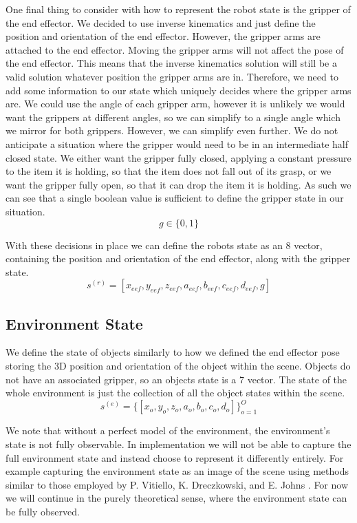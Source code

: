 One final thing to consider with how to represent the robot state is the gripper of the end effector. We decided to use inverse kinematics and just define the position and orientation of the end effector. However, the gripper arms are attached to the end effector. Moving the gripper arms will not affect the pose of the end effector. This means that the inverse kinematics solution will still be a valid solution whatever position the gripper arms are in. Therefore, we need to add some information to our state which uniquely decides where the gripper arms are. We could use the angle of each gripper arm, however it is unlikely we would want the grippers at different angles, so we can simplify to a single angle which we mirror for both grippers. However, we can simplify even further. We do not anticipate a situation where the gripper would need to be in an intermediate half closed state. We either want the gripper fully closed, applying a constant pressure to the item it is holding, so that the item does not fall out of its grasp, or we want the gripper fully open, so that it can drop the item it is holding. As such we can see that a single boolean value is sufficient to define the gripper state in our situation.
$$g \in \{0,1\}$$

With these decisions in place we can define the robots state as an 8 vector, containing the position and orientation of the end effector, along with the gripper state. 
$$s^{(r)} = [x_{eef}, y_{eef}, z_{eef}, a_{eef}, b_{eef}, c_{eef}, d_{eef}, g]$$

\subsection{Environment State}
We define the state of objects similarly to how we defined the end effector pose storing the 3D position and orientation of the object within the scene. Objects do not have an associated gripper, so an objects state is a 7 vector. The state of the whole environment is just the collection of all the object states within the scene.
$$s^{(e)} = \{[x_o, y_o, z_o, a_o, b_o, c_o, d_o]\}_{o=1}^O$$

We note that without a perfect model of the environment, the environment's state is not fully observable. In implementation we will not be able to capture the full environment state and instead choose to represent it differently entirely. For example capturing the environment state as an image of the scene using methods similar to those employed by P. Vitiello, K. Dreczkowski, and E. Johns \cite{one-shot-pose-estimate}. For now we will continue in the purely theoretical sense, where the environment state can be fully observed.\\

